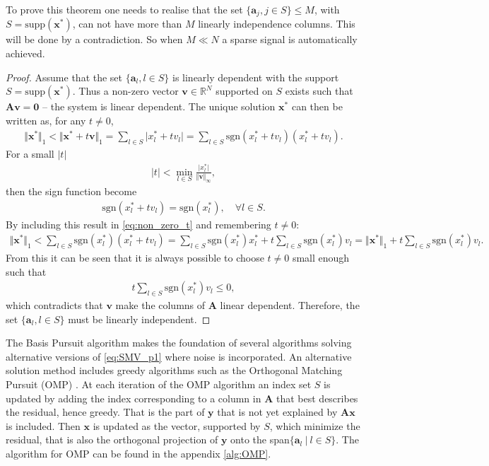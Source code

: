 To prove this theorem one needs to realise that the set $\lbrace \mathbf{a}_j, j \in S \rbrace \leq M$, with $S = \text{supp}(\mathbf{x}^\ast)$, can not have more than $M$ linearly independence columns. This will be done by a contradiction.
So when $M \ll N$ a sparse signal is automatically achieved.
\begin{proof}
Assume that the set $\lbrace \mathbf{a}_l, l \in S \rbrace$ is linearly dependent with the support $S = \text{supp}(\mathbf{x}^\ast)$.
Thus a non-zero vector $\mathbf{v} \in \mathbb{R}^N$ supported on $S$ exists such that $\mathbf{Av} = \textbf{0}$ -- the system is linear dependent. The unique solution $\mathbf{x}^\ast$ can then be written as, for any $t \neq 0$,
\begin{align}\label{eq:non_zero_t}
\Vert \mathbf{x}^\ast \Vert_1 < \Vert \mathbf{x}^\ast + t \mathbf{v} \Vert_1 = \sum_{l \in S} \vert x_l^\ast + t v_l \vert = \sum_{l \in S} \text{sgn}(x_l^\ast + t v_l )(x_l^\ast + t v_l ).
\end{align}
For a small $|t|$
\begin{align*}
|t| < \min_{l \in S} \frac{\vert x_l^\ast \vert}{\Vert \mathbf{v} \Vert_{\infty}},
\end{align*}
then the sign function become
\begin{align*}
\text{sgn}(x_l^\ast + t v_l) = \text{sgn}(x_l^\ast), \quad \forall l \in S.
\end{align*}
By including this result in \eqref{eq:non_zero_t} and remembering $t \neq 0$:
\begin{align*}
\Vert \textbf{x}^{\ast} \Vert_1 < \sum_{l \in S} \text{sgn}(x_l^{\ast})(x_l^{\ast} + t v_l ) = \sum_{l \in S} \text{sgn}(x_l^{\ast})x_l^{\ast} + t \sum_{l \in S} \text{sgn}(x_l^{\ast})v_l = \Vert \textbf{x}^{\ast} \Vert_1 + t \sum_{l \in S} \text{sgn}(x_l^{\ast})v_l.
\end{align*}
From this it can be seen that it is always possible to choose $t \neq 0$ small enough such that 
\begin{align*}
t \sum_{l \in S} \text{sgn}(x_l^\ast)v_l \leq 0,
\end{align*}
which contradicts that $\mathbf{v}$ make the columns of $\mathbf{A}$ linear dependent. 
Therefore, the set $\lbrace \mathbf{a}_l, l \in S \rbrace$ must be linearly independent.
\end{proof}
The Basis Pursuit algorithm makes the foundation of several algorithms solving alternative versions of \eqref{eq:SMV_p1} where noise is incorporated. 
An alternative solution method includes greedy algorithms such as the Orthogonal Matching Pursuit (OMP) \cite[P. 65]{FR}. 
At each iteration of the OMP algorithm an index set $S$ is updated by adding the index corresponding to a column in $\mathbf{A}$ that best describes the residual, hence greedy.
That is the part of $\mathbf{y}$ that is not yet explained by $\mathbf{Ax}$ is included. 
Then $\mathbf{x}$ is updated as the vector, supported by $S$, which minimize the residual, that is also the orthogonal projection of $\mathbf{y}$ onto the span$\lbrace \mathbf{a}_l \ \vert \ l \in S \rbrace$. The algorithm for OMP can be found in the appendix \ref{alg:OMP}.

